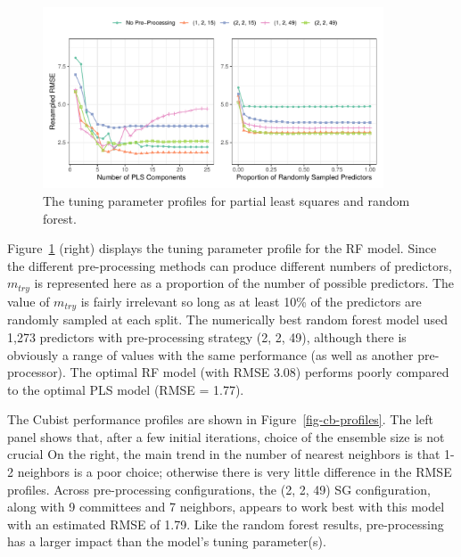 \documentclass[
  letterpaper,
  DIV=11,
  numbers=noendperiod]{scrartcl}
\begin{document}
\begin{figure}[t!]

{\centering \includegraphics[width=0.9\textwidth,height=\textheight]{figures/fig-pls-rf-tune-profiles-1.pdf}

}

\caption{\label{fig-pls-rf-tune-profiles}The tuning parameter profiles
for partial least squares and random forest.}

\end{figure}

Figure~\ref{fig-pls-rf-tune-profiles} (right) displays the tuning
parameter profile for the RF model. Since the different pre-processing
methods can produce different numbers of predictors, \(m_{try}\) is
represented here as a proportion of the number of possible predictors.
The value of \(m_{try}\) is fairly irrelevant so long as at least 10\%
of the predictors are randomly sampled at each split. The numerically
best random forest model used 1,273 predictors with pre-processing
strategy (2, 2, 49), although there is obviously a range of values with
the same performance (as well as another pre-processor). The optimal RF
model (with RMSE 3.08) performs poorly compared to the optimal PLS model
(RMSE = 1.77).

The Cubist performance profiles are shown in
Figure~\ref{fig-cb-profiles}. The left panel shows that, after a few
initial iterations, choice of the ensemble size is not crucial On the
right, the main trend in the number of nearest neighbors is that 1-2
neighbors is a poor choice; otherwise there is very little difference in
the RMSE profiles. Across pre-processing configurations, the (2, 2, 49)
SG configuration, along with 9 committees and 7 neighbors, appears to
work best with this model with an estimated RMSE of 1.79. Like the
random forest results, pre-processing has a larger impact than the
model's tuning parameter(s).
\end{document}
